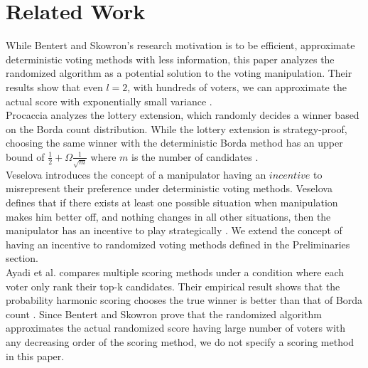 \documentclass[letterpaper]{article} %
\begin{document}
\section{Related Work}
While Bentert and Skowron's research motivation is to be efficient, approximate deterministic voting methods with less information, this paper analyzes the randomized algorithm as a potential solution to the voting manipulation. Their results show that even $l = 2$, with hundreds of voters, we can approximate the actual score with exponentially small variance \cite{Skowron}.\\
Procaccia analyzes the lottery extension, which randomly decides a winner based on the Borda count distribution. While the lottery extension is strategy-proof, choosing the same winner with the deterministic Borda method has an upper bound of $\frac{1}{2} +\Omega{ \frac{1}{\sqrt{m}} }$ where $m$ is the number of candidates \cite{Procaccia_1}.\\
Veselova introduces the concept of a manipulator having an $incentive$ to misrepresent their preference under deterministic voting methods. Veselova defines that if there exists at least one possible situation when manipulation makes him better off, and nothing changes in all other situations, then the manipulator has an incentive to play strategically \cite{Veselova}. We extend the concept of having an incentive to randomized voting methods defined in the Preliminaries section.\\
Ayadi et al. compares multiple scoring methods under a condition where each voter only rank their top-k candidates. Their empirical result shows that the probability harmonic scoring chooses the true winner is better than that of Borda count \cite{Ayadi}. Since Bentert and Skowron prove that the randomized algorithm approximates the actual randomized score having large number of voters with any decreasing order of the scoring method, we do not specify a scoring method in this paper. %

\end{document}
